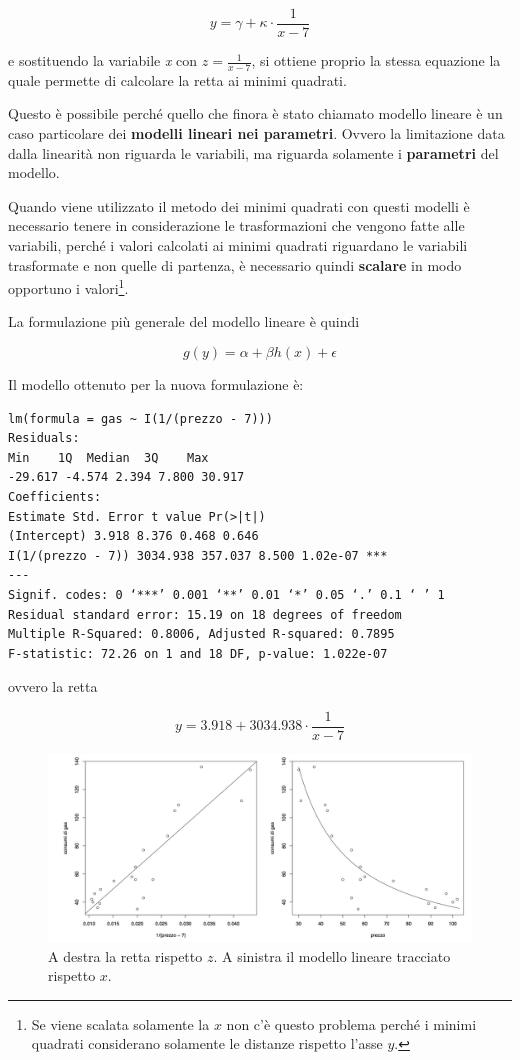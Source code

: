 $$
y = \gamma + \kappa \cdot \frac{1}{x-7}
$$

e sostituendo la variabile \textit{x} con $ z = \frac{1}{x-7} $, si ottiene proprio la stessa equazione la quale permette di calcolare la retta ai minimi quadrati.

Questo è possibile perché quello che finora è stato chiamato modello lineare è un caso particolare dei \textbf{modelli lineari nei parametri}. Ovvero la limitazione data dalla linearità non riguarda le variabili, ma riguarda solamente i \textbf{parametri} del modello.

Quando viene utilizzato il metodo dei minimi quadrati con questi modelli è necessario tenere in considerazione le trasformazioni che vengono fatte alle variabili, perché i valori calcolati ai minimi quadrati riguardano le variabili trasformate e non quelle di partenza, è necessario quindi \textbf{scalare} in modo opportuno i valori\footnote{Se viene scalata solamente la $ x $ non c'è questo problema perché i minimi quadrati considerano solamente le distanze rispetto l'asse $ y $.}.

La formulazione più generale del modello lineare è quindi

$$
g(y) = \alpha + \beta h(x) + \epsilon
$$

Il modello ottenuto per la nuova formulazione è:
\begin{verbatim}
lm(formula = gas ~ I(1/(prezzo - 7)))
Residuals:
Min    1Q  Median  3Q    Max
-29.617 -4.574 2.394 7.800 30.917
Coefficients:
Estimate Std. Error t value Pr(>|t|) 
(Intercept) 3.918 8.376 0.468 0.646
I(1/(prezzo - 7)) 3034.938 357.037 8.500 1.02e-07 *** 
---
Signif. codes: 0 ‘***’ 0.001 ‘**’ 0.01 ‘*’ 0.05 ‘.’ 0.1 ‘ ’ 1
Residual standard error: 15.19 on 18 degrees of freedom 
Multiple R-Squared: 0.8006, Adjusted R-squared: 0.7895 
F-statistic: 72.26 on 1 and 18 DF, p-value: 1.022e-07
\end{verbatim}

ovvero la retta

$$
y = 3.918 + 3034.938 \cdot \frac{1}{x-7}
$$

\begin{figure}[htbp]
	\centering
	\includegraphics[width=1.1\textwidth]{./notes/immagini/l7-fig3.png}
	\caption{A destra la retta rispetto $ z $. A sinistra il modello lineare tracciato rispetto $ x $.}
\end{figure}

